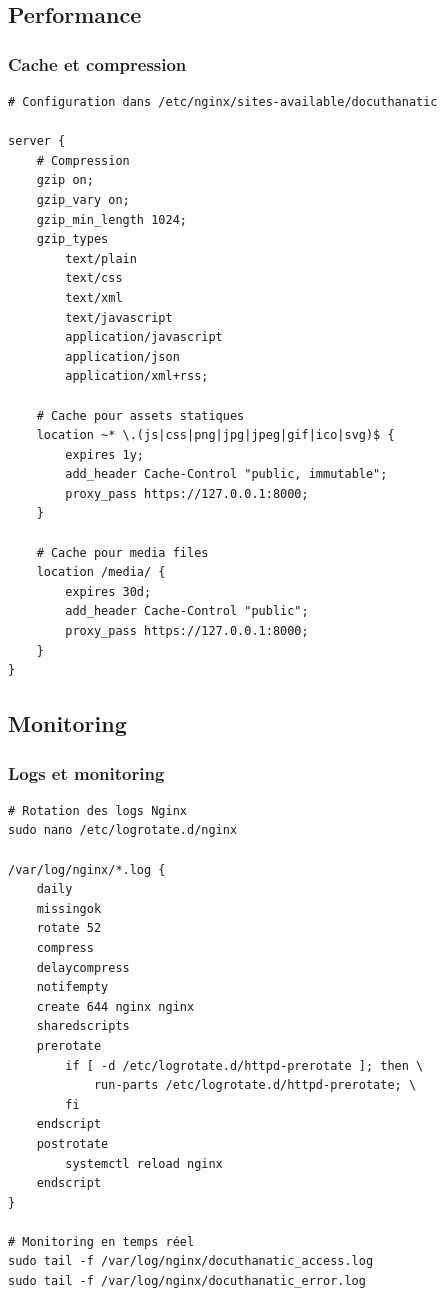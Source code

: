 \documentclass[12pt,a4paper]{article}
\begin{document}
\subsection{Performance}

\subsubsection{Cache et compression}
\begin{lstlisting}[style=bash, caption={Optimisations performance Nginx}]
# Configuration dans /etc/nginx/sites-available/docuthanatic

server {
    # Compression
    gzip on;
    gzip_vary on;
    gzip_min_length 1024;
    gzip_types
        text/plain
        text/css
        text/xml
        text/javascript
        application/javascript
        application/json
        application/xml+rss;
    
    # Cache pour assets statiques
    location ~* \.(js|css|png|jpg|jpeg|gif|ico|svg)$ {
        expires 1y;
        add_header Cache-Control "public, immutable";
        proxy_pass https://127.0.0.1:8000;
    }
    
    # Cache pour media files
    location /media/ {
        expires 30d;
        add_header Cache-Control "public";
        proxy_pass https://127.0.0.1:8000;
    }
}
\end{lstlisting}

\subsection{Monitoring}

\subsubsection{Logs et monitoring}
\begin{lstlisting}[style=bash, caption={Configuration monitoring}]
# Rotation des logs Nginx
sudo nano /etc/logrotate.d/nginx

/var/log/nginx/*.log {
    daily
    missingok
    rotate 52
    compress
    delaycompress
    notifempty
    create 644 nginx nginx
    sharedscripts
    prerotate
        if [ -d /etc/logrotate.d/httpd-prerotate ]; then \
            run-parts /etc/logrotate.d/httpd-prerotate; \
        fi
    endscript
    postrotate
        systemctl reload nginx
    endscript
}

# Monitoring en temps réel
sudo tail -f /var/log/nginx/docuthanatic_access.log
sudo tail -f /var/log/nginx/docuthanatic_error.log
\end{lstlisting}
\end{document}
